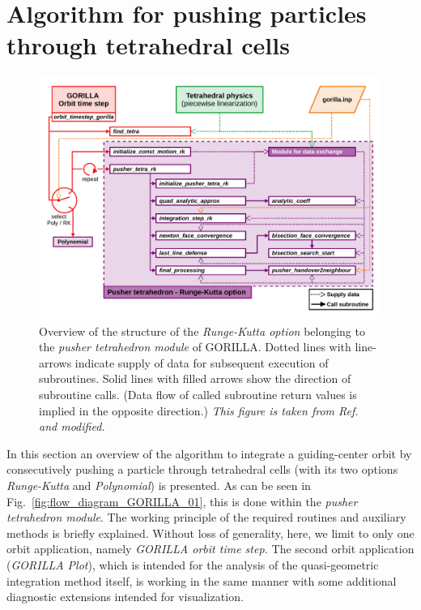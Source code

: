 \documentclass{TheMartianReport}
\begin{document}
\section{Algorithm for pushing particles \\ through tetrahedral cells}
%
\begin{figure}[h]
	\centerline{\includegraphics[keepaspectratio,width=1.05\linewidth, trim=0 20 0 20, clip]{figures/flow_diagram_GORILLA_03.pdf}}
	\captionsetup{justification=raggedright,singlelinecheck=false,textfont=footnotesize,labelfont=footnotesize}
	\caption{Overview of the structure of the \textit{Runge-Kutta option} belonging to the \textit{pusher tetrahedron module} of GORILLA. Dotted lines with line-arrows indicate supply of data for subsequent execution of subroutines. Solid lines with filled arrows show the direction of subroutine calls. (Data flow of called subroutine return values is implied in the opposite direction.) \textit{This figure is taken from Ref.~ and modified.}}
	\label{fig:flow_diagram_GORILLA_03}
\end{figure}
%
In this section an overview of the algorithm to integrate a guiding-center orbit by consecutively pushing a particle through tetrahedral cells (with its two options \textit{Runge-Kutta} and \textit{Polynomial}) is presented. As can be seen in Fig.~\ref{fig:flow_diagram_GORILLA_01}, this is done within the \textit{pusher tetrahedron module}. The working principle of the required routines and auxiliary methods is briefly explained.  Without loss of generality, here, we limit to only one orbit application, namely \textit{GORILLA orbit time step.} The second orbit application (\textit{GORILLA Plot}), which is intended for the analysis of the quasi-geometric integration method itself, is working in the same manner with some additional diagnostic extensions intended for visualization.
\end{document}
